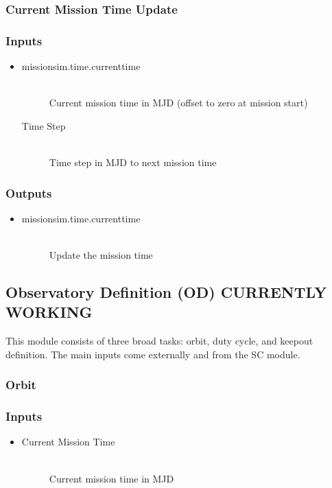 \documentclass[]{asme2ej}
\begin{document}
\subsubsection{Current Mission Time Update}

\subsubsection*{Inputs}
\begin{itemize}
    \item 
    \begin{description}
        \item[missionsim.time.currenttime] \hfill \\
        Current mission time in MJD (offset to zero at mission start)
        \item[Time Step] \hfill \\
        Time step in MJD to next mission time
    \end{description}
\end{itemize}

\subsubsection*{Outputs}
\begin{itemize}
    \item
    \begin{description}
        \item[missionsim.time.currenttime] \hfill \\
        Update the mission time
    \end{description}
\end{itemize}


\subsection{Observatory Definition (OD) CURRENTLY WORKING}
This module consists of three broad tasks: orbit, duty cycle, and keepout definition. The main inputs come externally and from the SC module.

\subsubsection{Orbit}

\subsubsection*{Inputs}
\begin{itemize}
    \item
    \begin{description}
        \item[Current Mission Time] \hfill \\
        Current mission time in MJD
    \end{description}
\end{itemize}
\end{document}
